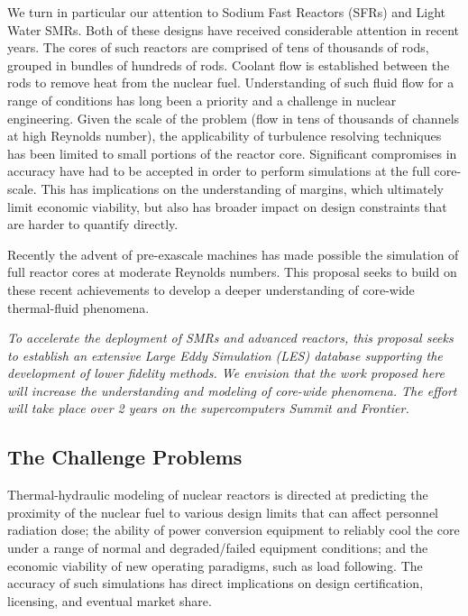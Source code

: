 \documentclass[11pt,letterpaper,english]{article}
\begin{document}
We turn in particular our attention to Sodium Fast Reactors (SFRs) and Light Water SMRs. Both of these designs have received considerable attention in recent years. The cores of such reactors are comprised of tens of thousands of rods, grouped in bundles of hundreds of rods. Coolant flow is established between the rods to remove heat from the nuclear fuel. Understanding of such fluid flow for a range of conditions has long been a priority and a challenge in nuclear engineering. Given the scale of the problem (flow in tens of thousands of channels at high Reynolds number), the applicability of turbulence resolving techniques has been limited to small portions of the reactor core. Significant compromises in accuracy have had to be accepted in order to perform simulations at the full core-scale. This has implications on the understanding of margins, which ultimately limit economic viability, but also has broader impact on design constraints that are harder to quantify directly.

Recently the advent of pre-exascale machines has made possible the simulation of full reactor cores at moderate Reynolds numbers. This proposal seeks to build on these recent achievements to develop a deeper understanding of core-wide thermal-fluid phenomena.

\textit{To accelerate the deployment of SMRs and advanced reactors, this proposal seeks to establish an extensive Large Eddy Simulation (LES) database supporting the development of lower fidelity methods. We envision that the work proposed here will increase the understanding and modeling of core-wide phenomena. The effort will take place over 2 years on the supercomputers Summit and Frontier.}

\vspace{-.25in}
\subsection{The Challenge Problems}
\vspace{-.2in}


Thermal-hydraulic modeling of nuclear reactors is directed at predicting the proximity of the nuclear fuel to various design limits that can affect personnel radiation dose; the ability of power conversion equipment to reliably cool the core under a range of normal and degraded/failed equipment conditions; and the economic viability of new operating paradigms, such as load following. The accuracy of such simulations has direct implications on design certification, licensing, and eventual market share. 
\end{document}
